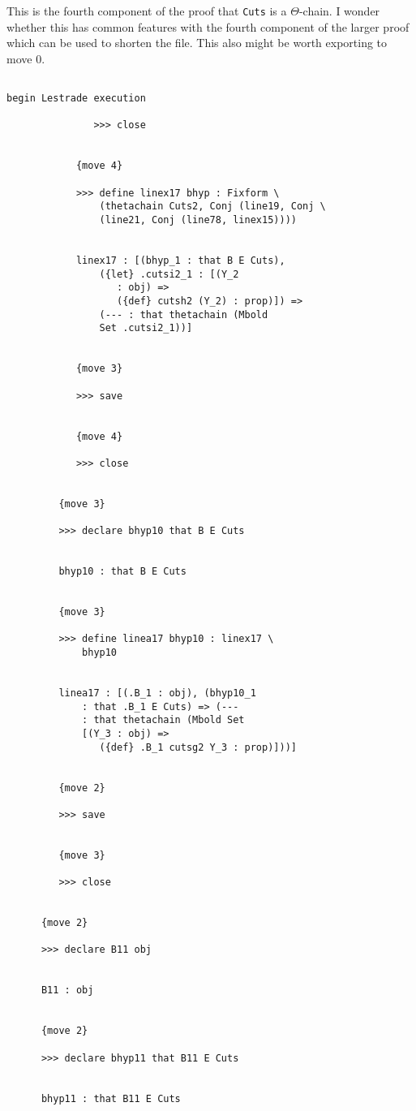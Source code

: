 \documentclass[12pt]{article}
\begin{document}
This is the fourth component of the proof that {\tt Cuts} is a $\Theta$-chain.  I wonder whether this has common features with the fourth component of the larger proof
which can be used to shorten the file.  This also might be worth exporting to move 0.

\begin{verbatim}

begin Lestrade execution

               >>> close


            {move 4}

            >>> define linex17 bhyp : Fixform \
                (thetachain Cuts2, Conj (line19, Conj \
                (line21, Conj (line78, linex15))))


            linex17 : [(bhyp_1 : that B E Cuts), 
                ({let} .cutsi2_1 : [(Y_2 
                   : obj) => 
                   ({def} cutsh2 (Y_2) : prop)]) => 
                (--- : that thetachain (Mbold 
                Set .cutsi2_1))]


            {move 3}

            >>> save


            {move 4}

            >>> close


         {move 3}

         >>> declare bhyp10 that B E Cuts


         bhyp10 : that B E Cuts


         {move 3}

         >>> define linea17 bhyp10 : linex17 \
             bhyp10


         linea17 : [(.B_1 : obj), (bhyp10_1 
             : that .B_1 E Cuts) => (--- 
             : that thetachain (Mbold Set 
             [(Y_3 : obj) => 
                ({def} .B_1 cutsg2 Y_3 : prop)]))]


         {move 2}

         >>> save


         {move 3}

         >>> close


      {move 2}

      >>> declare B11 obj


      B11 : obj


      {move 2}

      >>> declare bhyp11 that B11 E Cuts


      bhyp11 : that B11 E Cuts



\end{verbatim}
\end{document}
